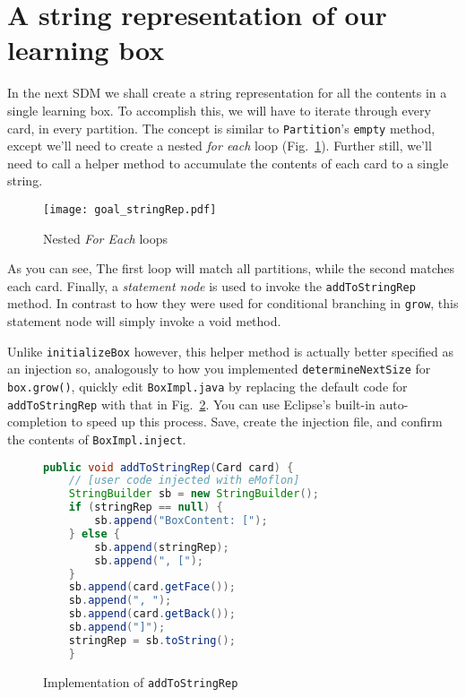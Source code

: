 \newpage
\hypertarget{sec:stringRep}{}
\section{A string representation of our learning box}
\label{sec_A string representation of our learning box}
\genHeader

In the next SDM we shall create a string representation for all the contents in a single learning box. To accomplish this, we will have to iterate through 
every card, in every partition. The concept is similar to \texttt{Partition}'s \texttt{empty} method, except we'll need to create a nested \emph{for each}
loop (Fig.~\ref{fig:goal_stringRep}). Further still, we'll need to call a helper method to accumulate the contents of each card to a single string.

\vspace{1cm}

\begin{figure}[htbp]
	\centering
	\texttt{[image: goal\_stringRep.pdf]}
	\caption{Nested \emph{For Each} loops}
	\label{fig:goal_stringRep}
\end{figure}

\vspace{1cm}

As you can see, The first loop will match all partitions, while the second matches each card. Finally, a \emph{statement node} is used to invoke the
\texttt{addToStringRep} method. In contrast to how they were used for conditional branching in \texttt{grow}, this statement node will simply invoke a
void method.

Unlike \texttt{initializeBox} however, this helper method is actually better specified as an injection so, analogously to how you implemented
\texttt{deter\-mine\-Next\-Size} for \texttt{box.grow()}, quickly edit \texttt{BoxImpl.java} by replacing the default code for \texttt{addToStringRep} with that
in Fig.~\ref{code:addToStringRep_inject_file}. You can use Eclipse's built-in auto-completion to speed up this process. Save, create the injection file, and
confirm the contents of \texttt{BoxImpl.inject}.

\newpage

\vspace*{3cm}

\begin{figure}[h!]
\centering
\begin{lstlisting}[language=Java, keywordstyle={\bfseries\color{purple}}, backgroundcolor=\color{white}]
public void addToStringRep(Card card) {
	// [user code injected with eMoflon]
	StringBuilder sb = new StringBuilder();
	if (stringRep == null) {
		sb.append("BoxContent: [");
	} else {
		sb.append(stringRep);
		sb.append(", [");
	}
	sb.append(card.getFace());
	sb.append(", ");
	sb.append(card.getBack());
	sb.append("]");
	stringRep = sb.toString();
	}
        \end{lstlisting}
        \caption{Implementation of \texttt{addToStringRep}}
        \label{code:addToStringRep_inject_file}
    \end{figure}
    \FloatBarrier





